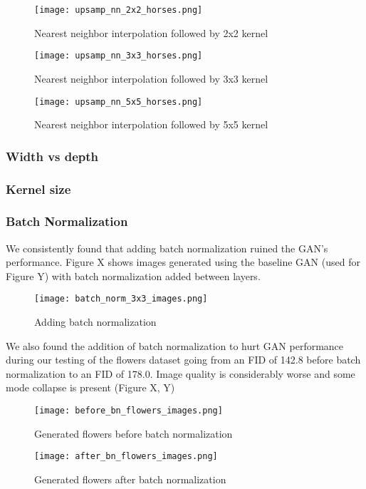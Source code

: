 \documentclass[sigplan,screen]{acmart}
\begin{document}
\begin{figure}
\texttt{[image: upsamp\_nn\_2x2\_horses.png]}
\caption{Nearest neighbor interpolation followed by 2x2 kernel}
\end{figure}

\begin{figure}
\texttt{[image: upsamp\_nn\_3x3\_horses.png]}
\caption{Nearest neighbor interpolation followed by 3x3 kernel}
\end{figure}

\begin{figure}
\texttt{[image: upsamp\_nn\_5x5\_horses.png]}
\caption{Nearest neighbor interpolation followed by 5x5 kernel}
\end{figure}

\subsubsection{Width vs depth}
\subsubsection{Kernel size}
\subsubsection{Batch Normalization}

We consistently found that adding batch normalization ruined the GAN's performance. Figure X shows images generated using the baseline GAN (used for Figure Y) with batch normalization added between layers.

\begin{figure}
\texttt{[image: batch\_norm\_3x3\_images.png]}
\caption{Adding batch normalization}
\end{figure}

We also found the addition of batch normalization to hurt GAN performance during our testing of the flowers dataset going from an FID of 142.8 before batch normalization to an FID of 178.0. Image quality is considerably worse and some mode collapse is present (Figure X, Y)

\begin{figure}
\texttt{[image: before\_bn\_flowers\_images.png]}
\caption{Generated flowers before batch normalization}
\end{figure}

\begin{figure}
\texttt{[image: after\_bn\_flowers\_images.png]}
\caption{Generated flowers after batch normalization}
\end{figure}
\end{document}

